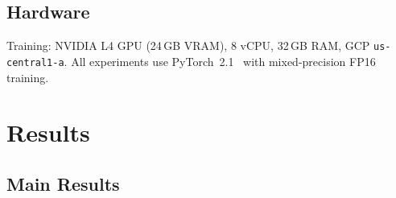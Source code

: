 \documentclass[10pt,twocolumn]{article}
\begin{document}
\subsection{Hardware}
Training: NVIDIA L4 GPU (24\,GB VRAM), 8 vCPU, 32\,GB RAM, GCP \texttt{us-central1-a}.
All experiments use PyTorch~2.1~\cite{pytorch2019} with mixed-precision FP16 training.

\section{Results}
\label{sec:results}

\subsection{Main Results}

\begin{table}[ht]
\centering
\caption{Benchmark Comparison Against Six Baselines. $\pm$ denotes standard deviations across 5 seeds. Best results in \textbf{bold}. $\downarrow$ = lower is better, $\uparrow$ = higher is better. Our method demonstrates bounded safety violations while maximizing Fleet Efficiency under strict multi-agent constraints. All baselines were retrained under identical latency and noise conditions.}
\label{tab:main}
\end{table}
\end{document}
